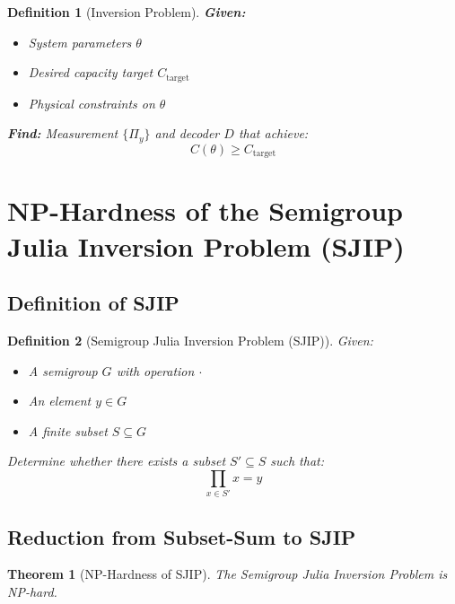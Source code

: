\documentclass[12pt,a4paper]{article}
\newtheorem{theorem}{Theorem}[section]
\newtheorem{definition}{Definition}[section]
\begin{document}
\begin{definition}[Inversion Problem]
\textbf{Given:}
\begin{itemize}
\item System parameters $\theta$
\item Desired capacity target $C_{\text{target}}$
\item Physical constraints on $\theta$
\end{itemize}

\textbf{Find:} Measurement $\{\Pi_y\}$ and decoder $D$ that achieve:
\begin{equation}
C(\theta) \geq C_{\text{target}}
\end{equation}
\end{definition}

\section{NP-Hardness of the Semigroup Julia Inversion Problem (SJIP)}

\subsection{Definition of SJIP}

\begin{definition}[Semigroup Julia Inversion Problem (SJIP)]
Given:
\begin{itemize}
\item A semigroup $G$ with operation $\cdot$
\item An element $y \in G$
\item A finite subset $S \subseteq G$
\end{itemize}
Determine whether there exists a subset $S' \subseteq S$ such that:
\begin{equation}
\prod_{x \in S'} x = y
\end{equation}
\end{definition}

\subsection{Reduction from Subset-Sum to SJIP}

\begin{theorem}[NP-Hardness of SJIP]
The Semigroup Julia Inversion Problem is NP-hard.
\end{theorem}
\end{document}
